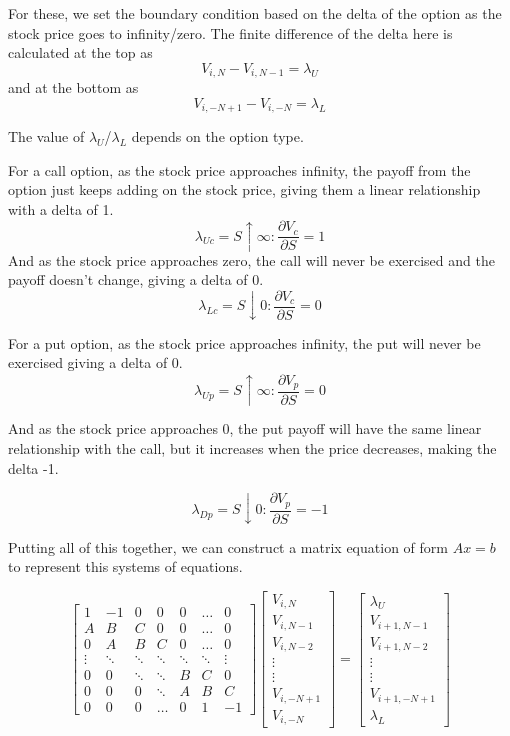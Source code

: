 \documentclass[11pt]{article}
\begin{document}
    For these, we set the boundary condition based on the delta of the
option as the stock price goes to infinity/zero. The finite difference
of the delta here is calculated at the top as
\[V_{i, N} - V_{i, N - 1} = \lambda_U\] and at the bottom as
\[V_{i, -N + 1} - V_{i, -N} = \lambda_L\]

The value of \(\lambda_U\)/\(\lambda_L\) depends on the option type.

For a call option, as the stock price approaches infinity, the payoff
from the option just keeps adding on the stock price, giving them a
linear relationship with a delta of 1.
\[\lambda_{Uc} = S \uparrow \infty: \frac{\partial V_c}{\partial S} = 1\]
And as the stock price approaches zero, the call will never be exercised
and the payoff doesn't change, giving a delta of 0.
\[\lambda_{Lc} = S \downarrow 0: \frac{\partial V_c}{\partial S} = 0\]

For a put option, as the stock price approaches infinity, the put will
never be exercised giving a delta of 0.
\[\lambda_{Up} = S \uparrow \infty: \frac{\partial V_p}{\partial S} = 0\]

And as the stock price approaches 0, the put payoff will have the same
linear relationship with the call, but it increases when the price
decreases, making the delta -1.

\[\lambda_{Dp} = S \downarrow 0: \frac{\partial V_p}{\partial S} = -1\]

    Putting all of this together, we can construct a matrix equation of form
\(Ax = b\) to represent this systems of equations.

\[\begin{bmatrix} 1 & - 1 & 0 & 0 & 0 & \ldots & 0 \\ A & B & C & 0 & 0 & \ldots & 0 \\ 0 & A & B & C & 0 & \ldots & 0 \\ \vdots & \ddots & \ddots & \ddots & \ddots & \ddots & \vdots \\ 0 & 0 & \ddots & \ddots & B & C & 0 \\ 0 & 0 & 0 & \ddots & A & B & C \\ 0 & 0 & 0 & \ldots & 0 & 1 & -1 \end{bmatrix} \begin{bmatrix} V_{i, N} \\ V_{i, N - 1} \\ V_{i, N - 2} \\ \vdots \\ \vdots \\ V_{i, -N + 1} \\ V_{i, -N} \end{bmatrix} = \begin{bmatrix} \lambda_U \\ V_{i+1,N-1} \\ V_{i+1, N-2} \\ \vdots \\ \vdots \\ V_{i+1,-N+1} \\ \lambda_L \end{bmatrix}\]
\end{document}
